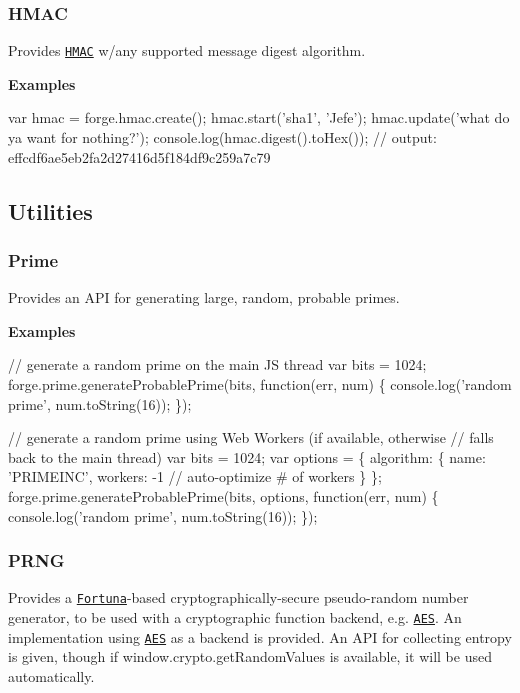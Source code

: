 \label{_hmac}%
 \subsubsection*{H\+M\+AC}

Provides \href{http://en.wikipedia.org/wiki/HMAC}{\tt H\+M\+AC} w/any supported message digest algorithm.

{\bfseries Examples}


\begin{DoxyCode}
var hmac = forge.hmac.create();
hmac.start('sha1', 'Jefe');
hmac.update('what do ya want for nothing?');
console.log(hmac.digest().toHex());
// output: effcdf6ae5eb2fa2d27416d5f184df9c259a7c79
\end{DoxyCode}
 

 \subsection*{Utilities}

\label{_prime}%
 \subsubsection*{Prime}

Provides an A\+PI for generating large, random, probable primes.

{\bfseries Examples}


\begin{DoxyCode}
// generate a random prime on the main JS thread
var bits = 1024;
forge.prime.generateProbablePrime(bits, function(err, num) \{
  console.log('random prime', num.toString(16));
\});

// generate a random prime using Web Workers (if available, otherwise
// falls back to the main thread)
var bits = 1024;
var options = \{
  algorithm: \{
    name: 'PRIMEINC',
    workers: -1 // auto-optimize # of workers
  \}
\};
forge.prime.generateProbablePrime(bits, options, function(err, num) \{
  console.log('random prime', num.toString(16));
\});
\end{DoxyCode}


\label{_prng}%
 \subsubsection*{P\+R\+NG}

Provides a \href{http://en.wikipedia.org/wiki/Fortuna_(PRNG)}{\tt Fortuna}-\/based cryptographically-\/secure pseudo-\/random number generator, to be used with a cryptographic function backend, e.\+g. \href{http://en.wikipedia.org/wiki/Advanced_Encryption_Standard}{\tt A\+ES}. An implementation using \href{http://en.wikipedia.org/wiki/Advanced_Encryption_Standard}{\tt A\+ES} as a backend is provided. An A\+PI for collecting entropy is given, though if window.\+crypto.\+get\+Random\+Values is available, it will be used automatically.

